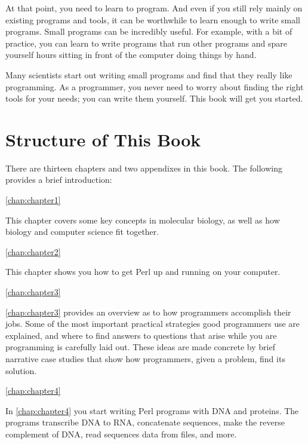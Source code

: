 At that point, you need to learn to program. And even if you still rely mainly on existing programs and tools, it can be worthwhile to learn enough to write small programs. Small programs can be incredibly useful. For example, with a bit of practice, you can learn to write programs that run other programs and spare yourself hours sitting in front of the computer doing things by hand.

Many scientists start out writing small programs and find that they really like programming. As a programmer, you never need to worry about finding the right tools for your needs; you can write them yourself. This book will get you started.

\section*{Structure of This Book}
There are thirteen chapters and two appendixes in this book. The following provides a brief introduction:

\autoref{chap:chapter1}
\begin{adjustwidth}{2em}{0cm}
This chapter covers some key concepts in molecular biology, as well as how biology and computer science fit together.
\end{adjustwidth}

\autoref{chap:chapter2}
\begin{adjustwidth}{2em}{0cm}
This chapter shows you how to get Perl up and running on your computer.
\end{adjustwidth}

\autoref{chap:chapter3}
\begin{adjustwidth}{2em}{0cm}
\autoref{chap:chapter3} provides an overview as to how programmers accomplish their jobs. Some of the most important practical strategies good programmers use are explained, and where to find answers to questions that arise while you are programming is carefully laid out. These ideas are made concrete by brief narrative case studies that show how programmers, given a problem, find its solution.
\end{adjustwidth}

\autoref{chap:chapter4}
\begin{adjustwidth}{2em}{0cm}
In \autoref{chap:chapter4} you start writing Perl programs with DNA and proteins. The programs transcribe DNA to RNA, concatenate sequences, make the reverse complement of DNA, read sequences data from files, and more.
\end{adjustwidth}

